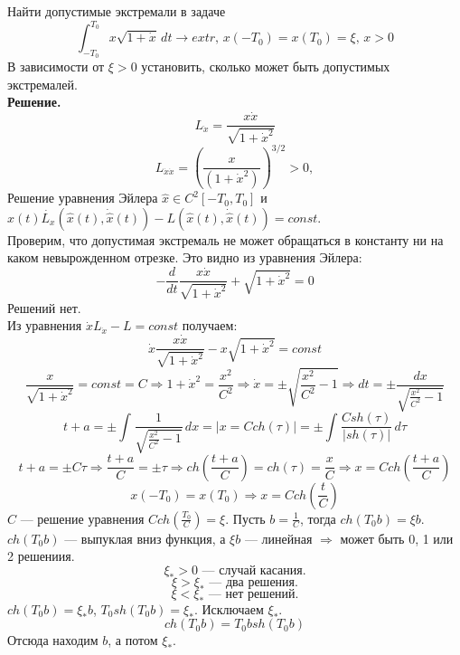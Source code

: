 \begin{task} \label{task6}
    Найти допустимые экстремали в задаче
    \[  \int_{-T_{0}}^{T_{0}} x\sqrt{1 + \dot{x}} \,dt \rightarrow extr\text{, }x(-T_{0}) = x(T_{0}) = \xi\text{, } x > 0 \]
    В зависимости от $\xi > 0$ установить, сколько может быть допустимых экстремалей. \\
    \textbf{Решение.} \\
    \[L_{\dot{x}} = \frac{x\dot{x}}{\sqrt{1 + \dot{x}^2}}\]
    \[L_{\dot{x}\dot{x}} = {(\frac{x}{(1 + \dot{x}^{2})})^ {3/2}} > 0,\]
    Решение уравнения Эйлера $\hat{x} \in C^2[-T_{0}, T_{0}]$ и $\hat{x}(t)\dot{L_{x}}(\hat{x}(t),
        \dot{\hat{x}}(t)) - L(\hat{x}(t),
        \dot{\hat{x}}(t)) = const$.\\
    Проверим, что допустимая экстремаль не может обращаться в константу ни на каком невырожденном отрезке. Это видно из уравнения Эйлера:
    \[-\frac{d}{dt} \frac{x\dot{x}}{\sqrt{1 + \dot{x}^2}} + \sqrt{1 + \dot{x}^2} = 0\]
    Решений нет. \\
    Из уравнения $\dot{x}L_{\dot{x}} - L = const$ получаем: \\
    \[ \dot{x} \frac{x\dot{x}}{\sqrt{1 + \dot{x}^2}} - x\sqrt{1 + \dot{x}^2} = const\]
    \[\frac{x}{\sqrt{1 + \dot{x}^2}} = const = C \Rightarrow 1 + \dot{x}^2 = \frac{x^2}{C^2} \Rightarrow \dot{x} = \pm \sqrt{\frac{x^2}{C^2} - 1} \Rightarrow dt = \pm \frac{dx}{\sqrt{\frac{x^2}{C^2} - 1}}\]
    \[t + a = \pm \int_{}^{}\frac{1}{\sqrt{\frac{x^2}{C^2} - 1}} \,dx = \left| x = Cch(\tau) \right| = \pm \int_{}^{}\frac{C sh(\tau)}{|sh(\tau)|} \,d\tau \]
    \[t + a = \pm C\tau \Rightarrow \frac{t+a}{C} = \pm \tau \Rightarrow ch\left(\frac{t+a}{C}\right) = ch(\tau) = \frac{x}{C} \Rightarrow x = Cch\left(\frac{t+a}{C}\right)\]
    \[x(-T_{0}) = x(T_{0}) \Rightarrow x = Cch\left(\frac{t}{C}\right)\]
    $C$ --- решение уравнения $Cch\left(\frac{T_{0}}{C}\right) = \xi$. Пусть $b = \frac{1}{C}$, тогда $ch(T_{0}b) = \xi b$. $ch(T_{0}b)$ --- выпуклая вниз функция, а $\xi b$ --- линейная $\Rightarrow$ может быть 0, 1 или 2 решениия.
    \[\xi_{*} > 0 \text{ --- случай касания.}\]
    \[\xi > \xi_{*} \text{ --- два решения.}\]
    \[\xi < \xi_{*} \text{ --- нет решений.}\]
    $ch(T_{0}b) = \xi_{*}b$, $T_{0}sh(T_{0}b) = \xi_{*}$. Исключаем $\xi_{*}$.
    \[ch(T_{0}b) = T_{0}bsh(T_{0}b)\]
    Отсюда находим $b$, а потом $\xi_{*}$.
\end{task}
